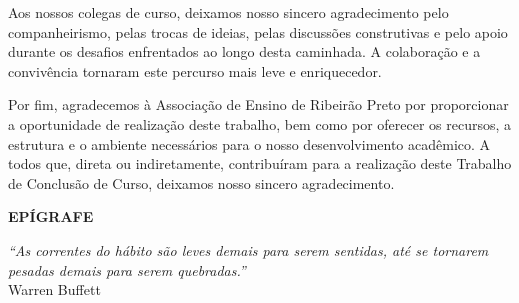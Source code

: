 Aos nossos colegas de curso, deixamos nosso sincero agradecimento pelo companheirismo, pelas trocas de ideias, pelas discussões construtivas e pelo apoio durante os desafios enfrentados ao longo desta caminhada. A colaboração e a convivência tornaram este percurso mais leve e enriquecedor.

Por fim, agradecemos à Associação de Ensino de Ribeirão Preto por proporcionar a oportunidade de realização deste trabalho, bem como por oferecer os recursos, a estrutura e o ambiente necessários para o nosso desenvolvimento acadêmico. A todos que, direta ou indiretamente, contribuíram para a realização deste Trabalho de Conclusão de Curso, deixamos nosso sincero agradecimento.
\newpage
\thispagestyle{empty}
\begin{center}
    \fontsize{14pt}{14pt}\selectfont\bfseries EPÍGRAFE\\[24pt]
\end{center}
\vspace*{\fill}
\begin{flushright}
    \parbox{8cm}{
        \textit{``As correntes do hábito são leves demais para serem sentidas, até se tornarem pesadas demais para serem quebradas.''}\\[6pt]
        Warren Buffett
    }
\end{flushright}

